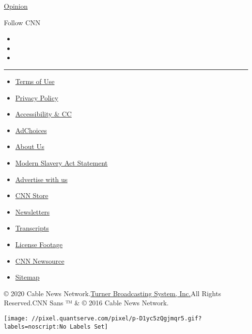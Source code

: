 \href{/opinions}{Opinion}

Follow CNN

\begin{itemize}
\item
\item
\item
\end{itemize}

\begin{center}\rule{0.5\linewidth}{\linethickness}\end{center}

\begin{itemize}
\tightlist
\item
  \href{/terms}{Terms of Use}
\item
  \href{/privacy}{Privacy Policy}
\item
  \href{/accessibility}{Accessibility \& CC}
\item
  \protect\hyperlink{}{AdChoices}
\item
  \href{/about}{About Us}
\item
  \href{/msa}{Modern Slavery Act Statement}
\item
  \href{https://commercial.cnn.com}{Advertise with us}
\item
  \href{//store.cnn.com}{CNN Store}
\item
  \href{/newsletters}{Newsletters}
\item
  \href{/transcripts}{Transcripts}
\item
  \href{/collection}{License Footage}
\item
  \href{http://cnnnewsource.com}{CNN Newsource}
\item
  \href{https://www.cnn.com/sitemap.html}{Sitemap}
\end{itemize}

© 2020 Cable News Network.\href{//www.turner.com}{Turner Broadcasting
System, Inc.}All Rights Reserved.CNN Sans ™ \& © 2016 Cable News
Network.

\texttt{[image: //pixel.quantserve.com/pixel/p-D1yc5zQgjmqr5.gif?labels=noscript:No Labels Set]}
